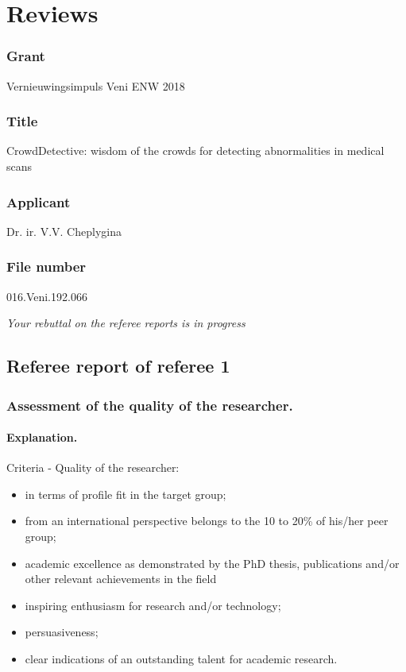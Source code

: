 \documentclass[serif, twocolumn, numeric, rga]{jote-article}
\begin{document}
\section*{Reviews}

\subsubsection*{Grant}
Vernieuwingsimpuls Veni ENW 2018

\subsubsection*{Title}
CrowdDetective: wisdom of the crowds for detecting abnormalities in medical scans

\subsubsection*{Applicant}
Dr. ir. V.V. Cheplygina

\subsubsection*{File number}
016.Veni.192.066

\noindent \textit{Your rebuttal on the referee reports is in progress}

 {}\subsection*{Referee report of referee 1} 

\subsubsection*{Assessment of the quality of the researcher.}
\paragraph{Explanation.}

Criteria - Quality of the researcher:
\begin{itemize}
    \item in terms of profile fit in the target group;
 \item from an international perspective belongs to the 10 to 20\% of his/her peer group;
 \item academic excellence as demonstrated by the PhD thesis, publications and/or other relevant achievements in the field 
    \item inspiring enthusiasm for research and/or technology;
 \item persuasiveness;
 \item clear indications of an outstanding talent for academic research. 
\end{itemize}
\end{document}
